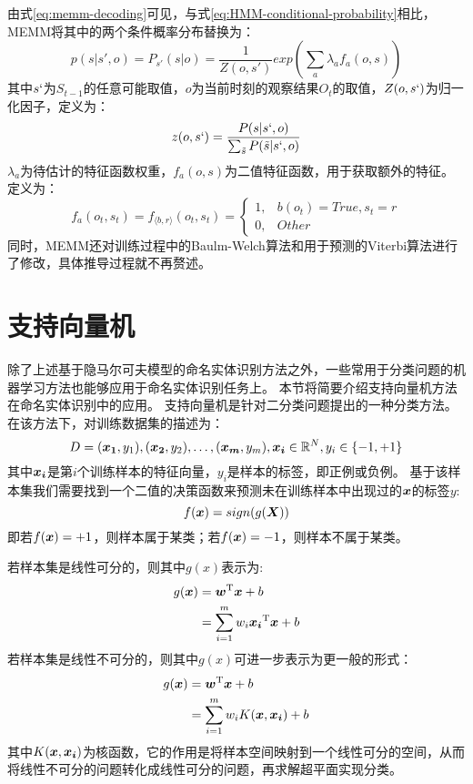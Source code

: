 由式\ref{eq:memm-decoding}可见，与式\ref{eq:HMM-conditional-probability}相比，MEMM将其中的两个条件概率分布替换为：
\begin{equation}
    p(s|s',o) = P_{s'}(s|o) = \frac{1}{Z(o,s')}exp(\sum_{a}\lambda_a f_a(o,s))
\end{equation}
其中$s`$为$S_{t-1}$的任意可能取值，$o$为当前时刻的观察结果$O_t$的取值，$Z(o,s`)$为归一化因子，定义为：
\begin{equation}
    z(o, s`) = \frac{P(s|s`,o)}{\sum_{\tilde{s}}P(\tilde{s}|s`,o)}
\end{equation}
$\lambda_a$为待估计的特征函数权重，$f_a(o,s)$为二值特征函数，用于获取额外的特征。定义为：
\begin{equation}
    f_a(o_t, s_t) = f_{\langle b,r\rangle}(o_t, s_t) = \left\{
        \begin{array}{lr}
        1, &b(o_t) = True, s_t = r\\
        0, &Other
        \end{array}
    \right.
\end{equation}
同时，MEMM还对训练过程中的Baulm-Welch算法和用于预测的Viterbi算法进行了修改，具体推导过程就不再赘述。

\section{支持向量机}
除了上述基于隐马尔可夫模型的命名实体识别方法之外，一些常用于分类问题的机器学习方法也能够应用于命名实体识别任务上。
本节将简要介绍支持向量机方法在命名实体识别中的应用。
支持向量机是针对二分类问题提出的一种分类方法。在该方法下，对训练数据集的描述为：
\begin{equation}
    D = {(\boldsymbol{x_1}, y_1), (\boldsymbol{x_2}, y_2), \dots, (\boldsymbol{x_m}, y_m)}, \boldsymbol{x_i} \in \mathbb{R}^N, y_i \in \{-1, +1\}
\end{equation}
其中$\boldsymbol{x_i}$是第$i$个训练样本的特征向量，$y_i$是样本的标签，即正例或负例。
基于该样本集我们需要找到一个二值的决策函数来预测未在训练样本中出现过的$\boldsymbol{x}$的标签$y$:
\begin{equation}
    f(\boldsymbol{x}) = sign(g(\boldsymbol{X}))
\end{equation}
即若$f(\boldsymbol{x}) = +1$，则样本属于某类；若$f(\boldsymbol{x}) = -1$，则样本不属于某类。

若样本集是线性可分的，则其中$g(x)$表示为:
\begin{align}
    g(\boldsymbol{x}) &= \boldsymbol{w}^{\mathrm{T}}\boldsymbol{x} + b\\
    &= \sum_{i = 1}^m w_i\boldsymbol{x_i}^{\mathrm{T}}\boldsymbol{x} + b
\end{align}
若样本集是线性不可分的，则其中$g(x)$可进一步表示为更一般的形式：
\begin{align}
    g(\boldsymbol{x}) &= \boldsymbol{w}^{\mathrm{T}}\boldsymbol{x} + b\\
    &= \sum_{i = 1}^m w_i K(\boldsymbol{x}, \boldsymbol{x_i}) + b
\end{align}
其中$K(\boldsymbol{x}, \boldsymbol{x_i})$为核函数，它的作用是将样本空间映射到一个线性可分的空间，从而将线性不可分的问题转化成线性可分的问题，再求解超平面实现分类。

